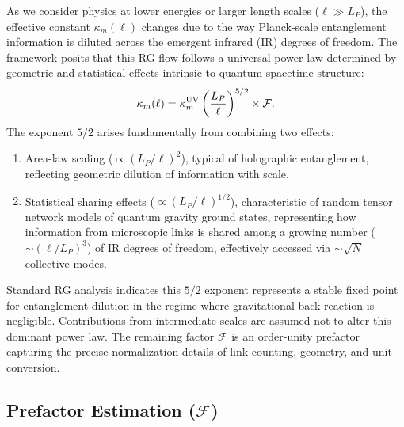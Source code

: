 \documentclass[11pt]{article}
\begin{document}
As we consider physics at lower energies or larger length scales ($\ell \gg L_P$), the effective constant $\kappa_m(\ell)$ changes due to the way Planck-scale entanglement information is diluted across the emergent infrared (IR) degrees of freedom. The framework posits that this RG flow follows a universal power law determined by geometric and statistical effects intrinsic to quantum spacetime structure:
$$ \kappa_m(\ell) = \kappa_m^{\rm UV} \left(\frac{L_P}{\ell}\right)^{5/2} \times \mathcal{F}. $$
The exponent $5/2$ arises fundamentally from combining two effects:
\begin{enumerate} %
    \item Area-law scaling ($\propto (L_P/\ell)^2$), typical of holographic entanglement, reflecting geometric dilution of information with scale.
    \item Statistical sharing effects ($\propto (L_P/\ell)^{1/2}$), characteristic of random tensor network models of quantum gravity ground states, representing how information from microscopic links is shared among a growing number ($\sim (\ell/L_P)^3$) of IR degrees of freedom, effectively accessed via $\sim \sqrt{N}$ collective modes.
\end{enumerate}
Standard RG analysis indicates this $5/2$ exponent represents a stable fixed point for entanglement dilution in the regime where gravitational back-reaction is negligible. Contributions from intermediate scales are assumed not to alter this dominant power law. The remaining factor $\mathcal{F}$ is an order-unity prefactor capturing the precise normalization details of link counting, geometry, and unit conversion.

\subsection*{Prefactor Estimation ($\mathcal{F}$)} %
\end{document}

